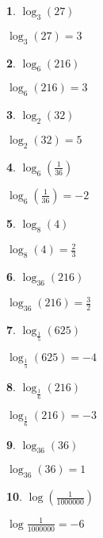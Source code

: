 \documentclass{amsbook}
\newtheorem{exc}{}
\newenvironment{ex}{\begin{exc}\normalfont}{\end{exc}}
\numberwithin{section}{chapter}
\numberwithin{equation}{chapter}
\begin{document}
\begin{multicols}{3}
\begin{ex}
	$\log_{3} (27)$ 
	\begin{sol}
		 $\log_{3} (27) = 3$
	\end{sol}
\end{ex}
\begin{ex}
	 $\log_{6} (216)$
	\begin{sol}
		$\log_{6} (216) = 3$
	\end{sol}
\end{ex}
\begin{ex}
	 $\log_{2} (32)$
	\begin{sol}
		$\log_{2} (32) = 5$
	\end{sol}
\end{ex}
\begin{ex}
	$\log_{6} \left( \frac{1}{36} \right)$
	\begin{sol}
		$\log_{6} \left( \frac{1}{36} \right) = -2$
	\end{sol}
\end{ex}
\begin{ex}
	$\log_{8} (4)$
	\begin{sol}
		$\log_{8} (4) = \frac{2}{3}$
	\end{sol}
\end{ex}
\begin{ex}
	$\log_{36} (216)$
	\begin{sol}
		$\log_{36} (216) = \frac{3}{2}$
	\end{sol}
\end{ex}
\begin{ex}
	$\log_{\frac{1}{5}} (625)$
	\begin{sol}
		$\log_{\frac{1}{5}} (625) = -4$
	\end{sol}
\end{ex}
\begin{ex}
	$\log_{\frac{1}{6}} (216)$
	\begin{sol}
		$\log_{\frac{1}{6}} (216) = -3$
	\end{sol}
\end{ex}
\begin{ex}
	$\log_{36} (36)$
	\begin{sol}
		$\log_{36} (36)=1$
	\end{sol}
\end{ex}
\begin{ex}
	$\log \left(\frac{1}{1000000}\right)$
	\begin{sol}
		$\log \frac{1}{1000000} = -6$
	\end{sol}
\end{ex}

\end{multicols}
\end{document}
